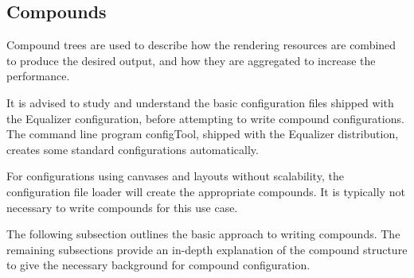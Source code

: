 \documentclass[10pt,a4]{scrartcl}
\begin{document}
\subsection{\label{sCompounds}Compounds}

Compound trees are used to describe how the rendering resources are
combined to produce the desired output, and how they are aggregated to
increase the performance. 

It is advised to study and understand the basic configuration files
shipped with the Equalizer configuration, before attempting to write
compound configurations. The command line program \textsf{configTool},
shipped with the Equalizer distribution, creates some standard
configurations automatically.

For configurations using canvases and layouts without scalability, the
configuration file loader will create the appropriate compounds. It is
typically not necessary to write compounds for this use case.

The following subsection outlines the basic approach to writing
compounds. The remaining subsections provide an in-depth explanation of
the compound structure to give the necessary background for compound
configuration.
\end{document}
